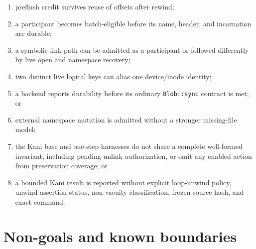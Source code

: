 \documentclass[10pt,twocolumn]{article}
\theoremstyle{remark}
\newcommand{\code}[1]{\texttt{#1}}
\begin{document}
\begin{enumerate}
  \item preflush credit survives reuse of offsets after rewind;
  \item a participant becomes batch-eligible before its name, header, and incarnation are durable;
  \item a symbolic-link path can be admitted as a participant or followed differently by live open
  and namespace recovery;
  \item two distinct live logical keys can alias one device/inode identity;
  \item a backend reports durability before its ordinary \code{Blob::sync} contract is met; or
  \item external namespace mutation is admitted without a stronger missing-file model;
  \item the Kani base and one-step harnesses do not share a complete well-formed invariant,
  including pending-unlink authorization, or omit any enabled action from preservation coverage;
  or
  \item a bounded Kani result is reported without explicit loop-unwind policy, unwind-assertion
  status, non-vacuity classification, frozen source hash, and exact command.
\end{enumerate}

\section{Non-goals and known boundaries}
\end{document}

